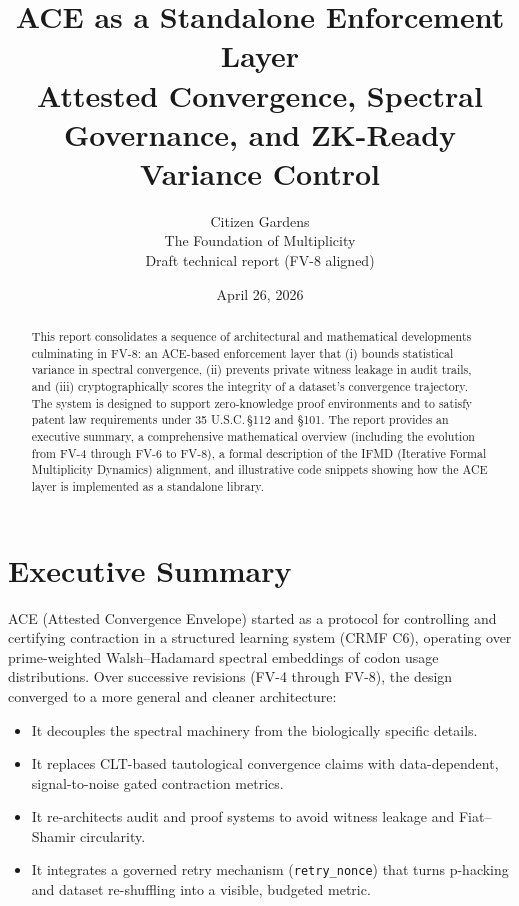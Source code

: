 \documentclass[11pt]{article}
\title{ACE as a Standalone Enforcement Layer\\
Attested Convergence, Spectral Governance, and ZK-Ready Variance Control}
\author{Citizen Gardens \\ The Foundation of Multiplicity\\
\vspace{0.25em}
\small{Draft technical report (FV-8 aligned)}}
\date{April 26, 2026}
\begin{document}
\maketitle

\begin{abstract}
This report consolidates a sequence of architectural and mathematical developments culminating in FV-8: an ACE-based enforcement layer that (i) bounds statistical variance in spectral convergence, (ii) prevents private witness leakage in audit trails, and (iii) cryptographically scores the integrity of a dataset's convergence trajectory. The system is designed to support zero-knowledge proof environments and to satisfy patent law requirements under 35 U.S.C.\,§112 and §101. The report provides an executive summary, a comprehensive mathematical overview (including the evolution from FV-4 through FV-6 to FV-8), a formal description of the IFMD (Iterative Formal Multiplicity Dynamics) alignment, and illustrative code snippets showing how the ACE layer is implemented as a standalone library.
\end{abstract}
\newpage
\tableofcontents

\newpage

\section{Executive Summary}

ACE (Attested Convergence Envelope) started as a protocol for controlling and certifying contraction in a structured learning system (CRMF C6), operating over prime-weighted Walsh--Hadamard spectral embeddings of codon usage distributions. Over successive revisions (FV-4 through FV-8), the design converged to a more general and cleaner architecture:

\begin{itemize}[nosep]
  \item It decouples the spectral machinery from the biologically specific details.
  \item It replaces CLT-based tautological convergence claims with data-dependent, signal-to-noise gated contraction metrics.
  \item It re-architects audit and proof systems to avoid witness leakage and Fiat--Shamir circularity.
  \item It integrates a governed retry mechanism (\texttt{retry\_nonce}) that turns p-hacking and dataset re-shuffling into a visible, budgeted metric.
\end{itemize}
\end{document}
